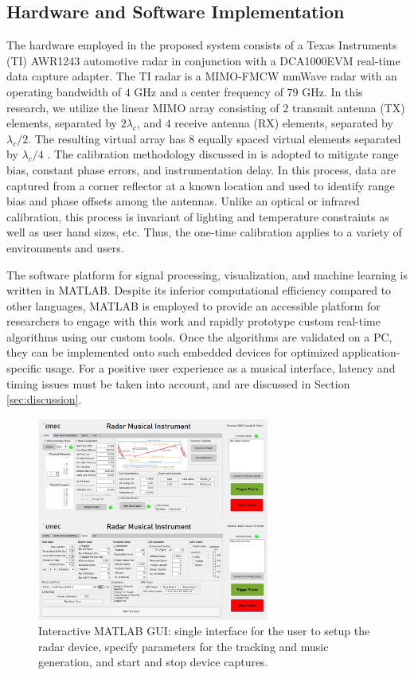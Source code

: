 \documentclass[10pt,journal,final]{IEEEtran}
\begin{document}
\subsection{Hardware and Software Implementation}
\label{subsec:hardware_setup_and_challenges}
The hardware employed in the proposed system consists of a Texas Instruments (TI) AWR1243 automotive radar in conjunction with a DCA1000EVM real-time data capture adapter. 
The TI radar is a MIMO-FMCW mmWave radar with an operating bandwidth of $4$ GHz and a center frequency of $79$ GHz. 
In this research, we utilize the linear MIMO array consisting of $2$ transmit antenna (TX) elements, separated by $2\lambda_c$, and $4$ receive antenna (RX) elements, separated by $\lambda_c/2$.
The resulting virtual array has 8 equally spaced virtual elements separated by $\lambda_c/4$ \cite{rao2017intro}. 
The calibration methodology discussed in \cite{yanik2020development} is adopted to mitigate range bias, constant phase errors, and instrumentation delay. 
In this process, data are captured from a corner reflector at a known location and used to identify range bias and phase offsets among the antennas.
Unlike an optical or infrared calibration, this process is invariant of lighting and temperature constraints as well as user hand sizes, etc.
Thus, the one-time calibration applies to a variety of environments and users.

The software platform for signal processing, visualization, and machine learning is written in MATLAB. 
Despite its inferior computational efficiency compared to other languages, MATLAB is employed to provide an accessible platform for researchers to engage with this work and rapidly prototype custom real-time algorithms using our custom tools.
Once the algorithms are validated on a PC, they can be implemented onto such embedded devices for optimized application-specific usage.
For a positive user experience as a musical interface, latency and timing issues must be taken into account, and are discussed in Section \ref{sec:discussion}.

\begin{figure}[h]
	\centering
	\includegraphics[width=3in]{smith3.jpg}
	\caption{Interactive MATLAB GUI: single interface for the user to setup the radar device, specify parameters for the tracking and music generation, and start and stop device captures.}
	\label{fig:matlab_gui}
\end{figure}
\end{document}
